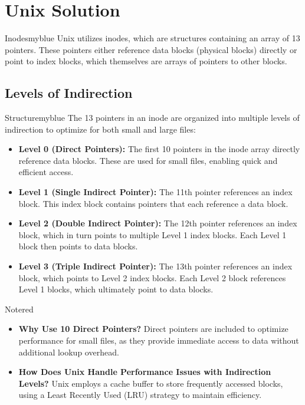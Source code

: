 \vspace{0.75cm}

\section{Unix Solution}
\begin{prettyBox}{Inodes}{myblue}
Unix utilizes inodes, which are structures containing an array of 13 pointers. These pointers either reference data blocks (physical blocks) directly or point to index blocks, which themselves are arrays of pointers to other blocks.
\end{prettyBox}

\subsection{Levels of Indirection}
\begin{prettyBox}{Structure}{myblue}
The 13 pointers in an inode are organized into multiple levels of indirection to optimize for both small and large files:
\begin{itemize}
    \item \textbf{Level 0 (Direct Pointers):} The first 10 pointers in the inode array directly reference data blocks. These are used for small files, enabling quick and efficient access.
    \item \textbf{Level 1 (Single Indirect Pointer):} The 11th pointer references an index block. This index block contains pointers that each reference a data block.
    \item \textbf{Level 2 (Double Indirect Pointer):} The 12th pointer references an index block, which in turn points to multiple Level 1 index blocks. Each Level 1 block then points to data blocks.
    \item \textbf{Level 3 (Triple Indirect Pointer):} The 13th pointer references an index block, which points to Level 2 index blocks. Each Level 2 block references Level 1 blocks, which ultimately point to data blocks.
\end{itemize}
\end{prettyBox}

\vspace{0.25cm}

\begin{prettyBox}{Note}{red}
\begin{itemize}
    \item \textbf{Why Use 10 Direct Pointers?} Direct pointers are included to optimize performance for small files, as they provide immediate access to data without additional lookup overhead.
    \item \textbf{How Does Unix Handle Performance Issues with Indirection Levels?} 
        Unix employs a cache buffer to store frequently accessed blocks, using a Least Recently Used (LRU) strategy to maintain efficiency.
\end{itemize}
\end{prettyBox}


